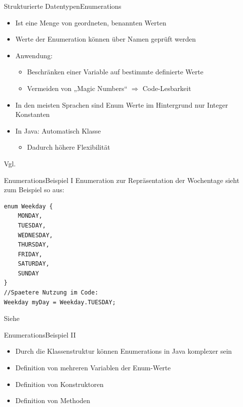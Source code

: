 \begin{frame}{Strukturierte Datentypen}{Enumerations}
    \begin{itemize}
        \item Ist eine Menge von geordneten, benannten Werten
        \item Werte der Enumeration können über Namen geprüft werden
        \item Anwendung:
        \begin{itemize}
            \item Beschränken einer Variable auf bestimmte definierte Werte
            \item Vermeiden von „Magic Numbers“ $\Rightarrow$ Code-Lesbarkeit
        \end{itemize}
        \item In den meisten Sprachen sind Enum Werte im Hintergrund nur Integer Konstanten
        \item In Java: Automatisch Klasse
        \begin{itemize}
            \item Dadurch höhere Flexibilität
        \end{itemize}
    \end{itemize}
Vgl. \cite{w3:enum}
\end{frame}

\begin{frame}[fragile]{Enumerations}{Beispiel I}
Enumeration zur Repräsentation der Wochentage sieht zum Beispiel so aus:
\lstset{style=java}
\begin{lstlisting}
enum Weekday {
    MONDAY,
    TUESDAY,
    WEDNESDAY,
    THURSDAY,
    FRIDAY,
    SATURDAY,
    SUNDAY
}
//Spaetere Nutzung im Code:
Weekday myDay = Weekday.TUESDAY;
\end{lstlisting}
Siehe \cite{w3:enum}
\end{frame}

\begin{frame}{Enumerations}{Beispiel II}
	\begin{itemize}
		\item Durch die Klassenstruktur können Enumerations in Java komplexer sein
		\item Definition von mehreren Variablen der Enum-Werte
		\item Definition von Konstruktoren
		\item Definition von Methoden
	\end{itemize}
    
\end{frame}

